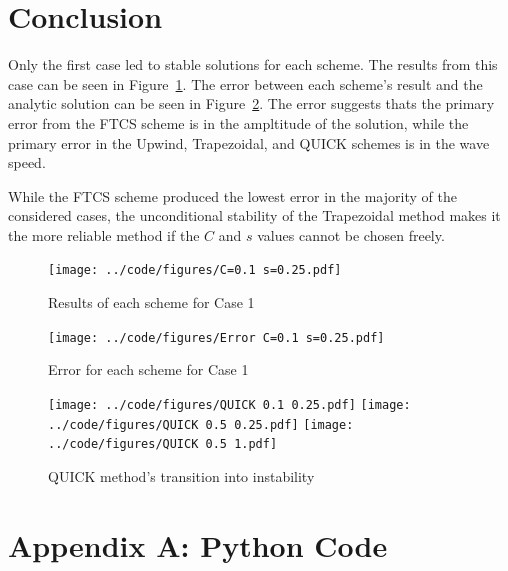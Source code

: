\documentclass[twocolumn,10pt]{asme2ej}
\begin{document}
\section{Conclusion}
Only the first case led to stable solutions for each scheme. The results from this case can be seen in Figure~\ref{case_1_results}. The error between each scheme's result and the analytic solution can be seen in Figure~\ref{case_1_error}. The error suggests thats the primary error from the FTCS scheme is in the ampltitude of the solution, while the primary error in the Upwind, Trapezoidal, and QUICK schemes is in the wave speed.

While the FTCS scheme produced the lowest error in the majority of the considered cases, the unconditional stability of the Trapezoidal method makes it the more reliable method if the $C$ and $s$ values cannot be chosen freely.

\begin{figure}[thb]
\begin{center}
\texttt{[image: ../code/figures/C=0.1 s=0.25.pdf]}
\caption{Results of each scheme for Case 1}
\label{case_1_results}
\end{center}
\end{figure}

\begin{figure}[thb]
\begin{center}
\texttt{[image: ../code/figures/Error C=0.1 s=0.25.pdf]}
\caption{Error for each scheme for Case 1}
\label{case_1_error}
\end{center}
\end{figure}

\nocite{*}



\begin{figure}[thb]
\begin{center}
\texttt{[image: ../code/figures/QUICK 0.1 0.25.pdf]}
\texttt{[image: ../code/figures/QUICK 0.5 0.25.pdf]}
\texttt{[image: ../code/figures/QUICK 0.5 1.pdf]}
\caption{QUICK method's transition into instability}
\label{QUICK_transition}
\end{center}
\end{figure}

\clearpage
\onecolumn
\appendix       %
\section*{Appendix A: Python Code}




\end{document}
